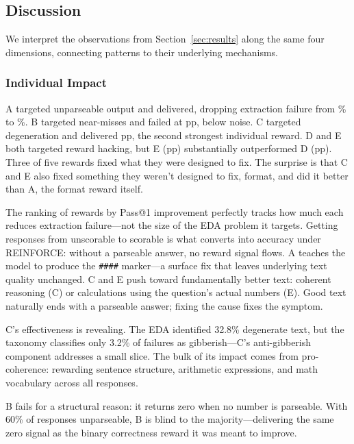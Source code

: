 \subsection{Discussion}
\nestindent

We interpret the observations from Section~\ref{sec:results} along the same four dimensions, connecting patterns to their underlying mechanisms.

\subsubsection{Individual Impact}
\nestindent

A targeted unparseable output and delivered, dropping extraction failure from \pFourBaselineExtrFail\% to \pFourSeparateAExtrFail\%.
B targeted near-misses and failed at \pFourSeparateBDeltaPassOne{}pp, below noise.
C targeted degeneration and delivered \pFourSeparateCDeltaPassOne{}pp, the second strongest individual reward.
D and E both targeted reward hacking, but E (\pFourSeparateEDeltaPassOne{}pp) substantially outperformed D (\pFourSeparateDDeltaPassOne{}pp).
Three of five rewards fixed what they were designed to fix.
The surprise is that C and E also fixed something they weren't designed to fix, format, and did it better than A, the format reward itself.

The ranking of rewards by Pass@1 improvement perfectly tracks how much each reduces extraction failure---not the size of the EDA problem it targets.
Getting responses from unscorable to scorable is what converts into accuracy under REINFORCE: without a parseable answer, no reward signal flows.
A teaches the model to produce the \texttt{\#\#\#\#} marker---a surface fix that leaves underlying text quality unchanged.
C and E push toward fundamentally better text: coherent reasoning (C) or calculations using the question's actual numbers (E).
Good text naturally ends with a parseable answer; fixing the cause fixes the symptom.

C's effectiveness is revealing.
The EDA identified 32.8\% degenerate text, but the taxonomy classifies only 3.2\% of failures as gibberish---C's anti-gibberish component addresses a small slice.
The bulk of its impact comes from pro-coherence: rewarding sentence structure, arithmetic expressions, and math vocabulary across all responses.

B fails for a structural reason: it returns zero when no number is parseable.
With 60\% of responses unparseable, B is blind to the majority---delivering the same zero signal as the binary correctness reward it was meant to improve.

